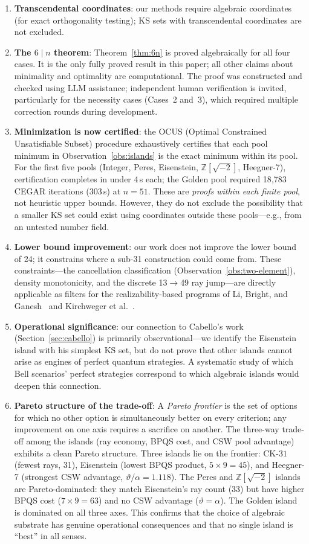 \documentclass[12pt,a4paper]{article}
\newcommand{\Z}{\mathbb{Z}}
\newcommand{\CK}{\mathrm{CK}\text{-}31}
\begin{document}
\begin{enumerate}
    \item \textbf{Transcendental coordinates}: our methods require algebraic coordinates (for exact orthogonality testing); KS sets with transcendental coordinates are not excluded.
    \item \textbf{The $6 \mid n$ theorem}: Theorem~\ref{thm:6n} is proved algebraically for all four cases.  It is the only fully proved result in this paper; all other claims about minimality and optimality are computational.  The proof was constructed and checked using LLM assistance; independent human verification is invited, particularly for the necessity cases (Cases~2 and~3), which required multiple correction rounds during development.
    \item \textbf{Minimization is now certified}: the OCUS (Optimal Constrained Unsatisfiable Subset) procedure exhaustively certifies that each pool minimum in Observation~\ref{obs:islands} is the exact minimum within its pool. For the first five pools (Integer, Peres, Eisenstein, $\Z[\sqrt{-2}]$, Heegner-7), certification completes in under 4\,s each; the Golden pool required 18{,}783 CEGAR iterations (303\,s) at $n = 51$. These are \emph{proofs within each finite pool}, not heuristic upper bounds. However, they do not exclude the possibility that a smaller KS set could exist using coordinates outside these pools---e.g., from an untested number field.
    \item \textbf{Lower bound improvement}: our work does not improve the lower bound of 24; it constrains where a sub-31 construction could come from.  These constraints---the cancellation classification (Observation~\ref{obs:two-element}), density monotonicity, and the discrete 13$\to$49 ray jump---are directly applicable as filters for the realizability-based programs of Li, Bright, and Ganesh~\cite{LiBrightGanesh2024} and Kirchweger et al.~\cite{KirchwegarPeitlSzeider2023}.
    \item \textbf{Operational significance}: our connection to Cabello's work (Section~\ref{sec:cabello}) is primarily observational---we identify the Eisenstein island with his simplest KS set, but do not prove that other islands cannot arise as engines of perfect quantum strategies. A systematic study of which Bell scenarios' perfect strategies correspond to which algebraic islands would deepen this connection.
    \item \textbf{Pareto structure of the trade-off}: A \emph{Pareto frontier} is the set of options for which no other option is simultaneously better on every criterion; any improvement on one axis requires a sacrifice on another.  The three-way trade-off among the islands (ray economy, BPQS cost, and CSW pool advantage) exhibits a clean Pareto structure.  Three islands lie on the frontier: $\CK$ (fewest rays, 31), Eisenstein (lowest BPQS product, $5 \times 9 = 45$), and Heegner-7 (strongest CSW advantage, $\vartheta/\alpha = 1.118$).  The Peres and $\Z[\sqrt{-2}]$ islands are Pareto-dominated: they match Eisenstein's ray count (33) but have higher BPQS cost ($7 \times 9 = 63$) and no CSW advantage ($\vartheta = \alpha$).  The Golden island is dominated on all three axes.  This confirms that the choice of algebraic substrate has genuine operational consequences and that no single island is ``best'' in all senses.

\end{enumerate}
\end{document}
